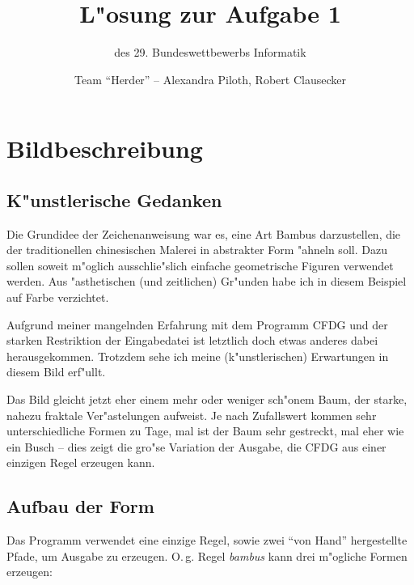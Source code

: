 \documentclass{scrreprt}
\author {Team "`Herder"' -- Alexandra Piloth, Robert Clausecker}
\title {L"osung zur Aufgabe 1}
\subtitle {des 29. Bundeswettbewerbs Informatik}
\begin{document}
\maketitle

\tableofcontents \newpage

\chapter{Bildbeschreibung}

\section{K"unstlerische Gedanken}
Die Grundidee der Zeichenanweisung war es, eine Art Bambus darzustellen, die der
traditionellen chinesischen Malerei in abstrakter Form "ahneln soll.  Dazu
sollen soweit m"oglich ausschlie"slich einfache geometrische Figuren verwendet
werden.  Aus "asthetischen (und zeitlichen) Gr"unden habe ich in diesem Beispiel
auf Farbe verzichtet.

Aufgrund meiner mangelnden Erfahrung mit dem Programm CFDG und der starken
Restriktion der Eingabedatei ist letztlich doch etwas anderes dabei
herausgekommen.  Trotzdem sehe ich meine (k"unstlerischen) Erwartungen in diesem
Bild erf"ullt.

Das Bild gleicht jetzt eher einem mehr oder weniger sch"onem Baum, der starke,
nahezu fraktale Ver"astelungen aufweist.  Je nach Zufallswert kommen sehr
unterschiedliche Formen zu Tage, mal ist der Baum sehr gestreckt, mal eher wie
ein Busch -- dies zeigt die gro"se Variation der Ausgabe, die CFDG aus einer
einzigen Regel erzeugen kann.

\section{Aufbau der Form}

Das Programm verwendet eine einzige Regel, sowie zwei "`von Hand"' hergestellte
Pfade, um Ausgabe zu erzeugen.  O.\,g. Regel \emph{bambus} kann drei m"ogliche
Formen erzeugen:
\end{document}
